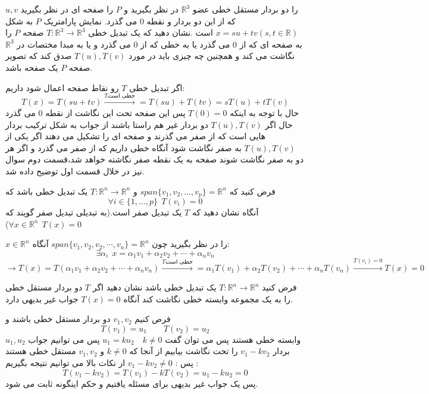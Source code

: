 \documentclass{article}
\begin{document}
$u,v$
 را دو بردار مستقل خطی عضو 
 $\mathbb{R}^3$
 در نظر بگیرید و 
 $P$
 را  صفحه ای در نظر بگیرید که از این دو بردار و نقطه 
 $0$
 می گذرد. نمایش پارامتریک 
 $P$
 به شکل 
 $x=su+tv(s,t \in \mathbb{R})$
 است .نشان دهید که یک تبدیل خطی 
 $T:\mathbb{R}^3\longrightarrow \mathbb{R}^3$
 صفحه 
 $P$
 را به صفحه ای که از 
 $0$
 می گذرد یا به خطی که از 
 $0$
 می گذرد و یا به مبدا مختصات در 
 $\mathbb{R}^3$
 نگاشت می کند و همچنین چه چیزی باید در مورد 
 $T(u),T(v)$
 صدق کند که تصویر صفحه 
 $P$
 یک صفحه باشد.
 \begin{حل}
 	اگر تبدیل خطی 
 	$T$
 	رو نقاط صفحه اعمال شود داریم:
 	$$T(x)=T(su+tv)\xrightarrow{\text{$T$خطی است}}=T(su)+T(tv)=sT(u)+tT(v)$$
 	حال با توجه به اینکه
 	$T(0)=0$
 	پس این صفحه تحت این نگاشت از نقطه $0$ می گذرد حال اگر 
 	$T(u),T(v)$
 	دو بردار غیر هم راستا باشند از جواب به شکل ترکیب بردار هایی است که از صفر می گذرند و صفحه ای را تشکیل می دهند اگر یکی از 
 	$T(u),T(v)$
 	به صفر نگاشت شود آنگاه خطی داریم که از صفر می گذرد و اگر هر دو به صفر نگاشت شوند صفحه به یک نقطه صفر نگاشته خواهد شد،قسمت دوم سوال نیز در خلال قسمت اول توضیح داده شد.
 	\end{حل}
 فرض کنید که 
 $span\{v_1,v_2,\ldots,v_p\}=\mathbb{R}^n$
 و 
 $T:\mathbb{R}^n\longrightarrow \mathbb{R}^n$
یک تبدیل خطی باشد که 
$$\forall i \in\{1,\ldots,p \}\ \ T(v_i)=0 $$
آنگاه نشان دهید که
$T$
 یک تبدیل صفر است.(به تبدیلی تبدیل صفر گویند که 
$\forall x\in \mathbb{R}^n \ \ T(x)=0$)
\begin{حل}
$x\in \mathbb{R}^n$
را در نظر بگیرید چون 
$span\{v_1,v_2,v_2,\cdots,v_n\}=\mathbb{R}^n$
آنگاه:
$$\exists \alpha_i \ \ x=\alpha_1v_1+\alpha_2v_2+\cdots+\alpha_nv_n$$
$$\longrightarrow T(x)=T(\alpha_1v_1+\alpha_2v_2+\cdots+\alpha_nv_n)\xrightarrow{\text{$T$خطی است}}=\alpha_1T(v_1)+\alpha_2T(v_2)+\cdots+\alpha_nT(v_n)\xrightarrow{\text{$T(v_i)=0$}}T(x)=0$$	
\end{حل}


فرض کنید 
$T:\mathbb{R}^n\longrightarrow \mathbb{R}^n$
یک تبدیل خطی باشد نشان دهید اگر 
$T$	
دو بردار مستقل خطی را به یک مجموعه وابسته خطی نگاشت کند آنگاه 
$T(x)=0$
جواب غیر بدیهی دارد.
\begin{حل}
	فرص کنیم 
	$v_1,v_2$
	دو بردار مستقل خطی باشند و
	$$T(v_1)=u_1\qquad T(v_2)=u_2$$
	$u_1,u_2$
	وابسته خطی هستند پس می توان گفت 
	$u_1=ku_2\quad k\neq0$
	پس می توانیم جواب بردار 
	$v_1-kv_2$
	را تحت نگاشت بیابیم از آنجا که 
	$k\neq0$
	و 
	$v_1,v_2$
	مستقل خطی هستند پس :
	$v_1-kv_2\neq0$
	از نکات بالا می توانیم نتیجه بگیریم :
	$$T(v_1-kv_2)=T(v_1)-kT(v_2)=u_1-ku_2=0$$
	پس یک جواب غیر بدیهی برای مسئله یافتیم و حکم اینگونه ثابت می شود.
	
	
\end{حل}
\end{document}
